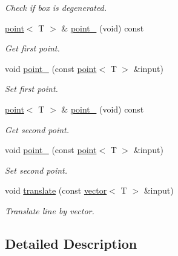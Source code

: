 \begin{DoxyCompactItemize}
\begin{DoxyCompactList}\small\item\em Check if box is degenerated. \end{DoxyCompactList}\item 
\mbox{\label{classddd_1_1box_a162deec493ec24352ea03b2332aa3f92}} 
\hyperlink{classddd_1_1point}{point}$<$ T $>$ \& \hyperlink{classddd_1_1box_a162deec493ec24352ea03b2332aa3f92}{point\+\_} (void) const
\begin{DoxyCompactList}\small\item\em Get first point. \end{DoxyCompactList}\item 
void \hyperlink{classddd_1_1box_a1c93232933a611b9e8acfac01381e36e}{point\+\_} (const \hyperlink{classddd_1_1point}{point}$<$ T $>$ \&input)
\begin{DoxyCompactList}\small\item\em Set first point. \end{DoxyCompactList}\item 
\mbox{\label{classddd_1_1box_a33f716b69a36ce32643a85ca93be22b5}} 
\hyperlink{classddd_1_1point}{point}$<$ T $>$ \& \hyperlink{classddd_1_1box_a33f716b69a36ce32643a85ca93be22b5}{point\+\_} (void) const
\begin{DoxyCompactList}\small\item\em Get second point. \end{DoxyCompactList}\item 
void \hyperlink{classddd_1_1box_a0ee76a1b2aba5285c3bf954bc5cc12ef}{point\+\_} (const \hyperlink{classddd_1_1point}{point}$<$ T $>$ \&input)
\begin{DoxyCompactList}\small\item\em Set second point. \end{DoxyCompactList}\item 
void \hyperlink{classddd_1_1box_a6069e4c7bfa545871ff229b4b7e7257f}{translate} (const \hyperlink{classddd_1_1vector}{vector}$<$ T $>$ \&input)
\begin{DoxyCompactList}\small\item\em Translate line by vector. \end{DoxyCompactList}\end{DoxyCompactItemize}


\subsection{Detailed Description}
